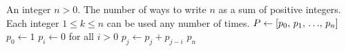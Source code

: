 
\begin{algorithmic}[1]
\Require An integer $n > 0$.
\Ensure The number of ways to write $n$ as a sum of positive
integers.  Each integer $1 \leq k \leq n$ can be used any number of
times.
\State $P \gets \left[ {p_0},\, {p_1},\, {\dots},\, {p_n} \right]$
\State $p_0 \gets 1$
\State $p_i \gets 0$ for all $i > 0$
    \State $p_j \gets p_j + p_{j-i}$
  \EndFor
\EndFor
\State \Return $p_n$
\end{algorithmic}

